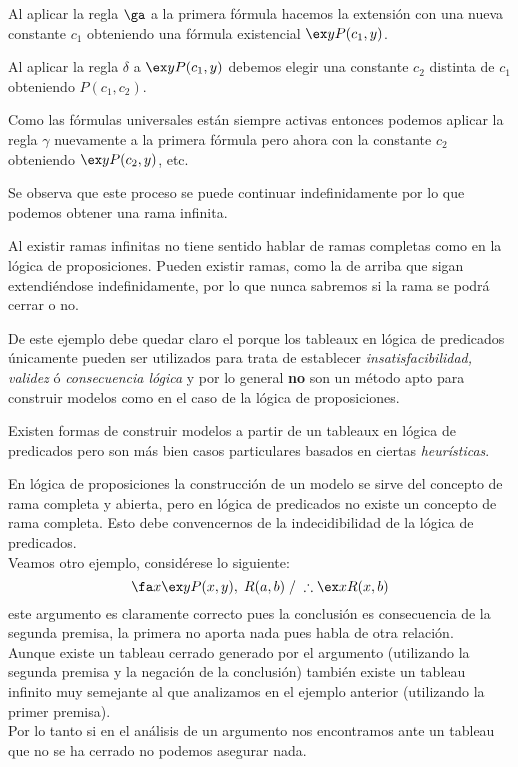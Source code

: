 \documentclass[11pt,letterpaper]{article}
\begin{document}
\bi
 \item Al aplicar la regla $\ga$ a la primera fórmula hacemos la extensión con 
  una nueva constante $c_1$ obteniendo una fórmula existencial $\ex y P(c_1,y)$.
 \item Al aplicar la regla $\delta$ a $\ex y P(c_1,y)$ debemos elegir una 
  constante $c_2$ distinta de $c_1$ obteniendo $ P(c_1,c_2)$.
 \item Como las fórmulas universales están siempre activas entonces podemos 
  aplicar la regla $\gamma$ nuevamente a la primera fórmula pero ahora con la 
  constante $c_2$ obteniendo $\ex y P(c_2,y)$, etc.
 \item Se observa que este proceso se puede continuar indefinidamente
  por lo que podemos obtener una rama infinita.
 \item Al existir ramas infinitas no tiene sentido hablar de 
  ramas completas como en la lógica de proposiciones. Pueden existir ramas, como 
  la de arriba que sigan extendi\'endose indefinidamente, por lo que nunca 
  sabremos si la rama se podrá cerrar o no.
\ei

De este ejemplo debe quedar claro el porque los tableaux en lógica de 
predicados únicamente pueden ser utilizados  para trata de establecer  
\emph{insatisfacibilidad, validez} ó \emph{consecuencia lógica} y  por lo 
general \textbf{no} son un método apto para construir modelos como en   el caso 
de la lógica de proposiciones. 

Existen formas de construir modelos a partir de un tableaux en lógica de   
predicados pero son m\'as bien casos particulares basados en ciertas   
\textit{heurísticas}.

En lógica de proposiciones la construcción de un modelo se sirve del concepto 
de rama completa y abierta, pero en lógica de predicados no existe un concepto 
de rama completa.
Esto debe convencernos de la indecidibilidad de la lógica de predicados. \\


\noindent Veamos otro ejemplo, consid\'erese lo siguiente:
$$ \fa x\ex y P(x,y),\; R(a,b)\;/\;\therefore \ex x R(x,b) $$
este argumento es claramente correcto pues la conclusión es consecuencia de la 
segunda premisa, la primera no aporta nada pues habla de otra relación. \\
Aunque existe un tableau cerrado generado por el argumento (utilizando la 
segunda premisa y la negaci\'on de la conclusión) también existe un tableau 
infinito muy semejante al que analizamos en el ejemplo anterior (utilizando la 
primer premisa). \\
Por lo tanto si en el análisis de un argumento nos encontramos ante 
un tableau que no se ha cerrado no podemos asegurar nada.
\end{document}
